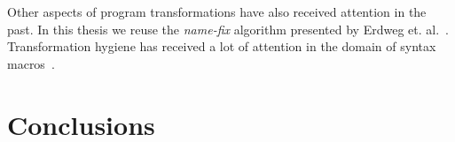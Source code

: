 Other aspects of program transformations have also received attention in the past. In this thesis we reuse the \textit{name-fix} algorithm presented by Erdweg et. al.~\cite{Erdweg2014}. Transformation hygiene has received a lot of attention in the domain of syntax macros~\cite{Kohlbecker1986,Herman2010a,Disney2014}. 

\section{Conclusions}
